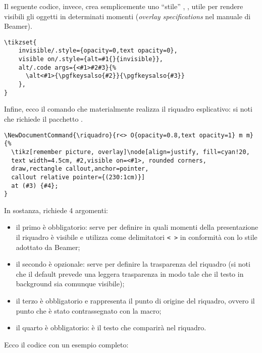 Il seguente codice, invece, crea semplicemente uno ``stile'' \Tikz{}, , utile per rendere visibili gli oggetti in determinati momenti (\emph{overlay specifications} nel manuale di Beamer). 
\begin{lstlisting}[frame=lines]
\tikzset{
    invisible/.style={opacity=0,text opacity=0},
    visible on/.style={alt=#1{}{invisible}},
    alt/.code args={<#1>#2#3}{%
      \alt<#1>{\pgfkeysalso{#2}}{\pgfkeysalso{#3}}
    },
}
\end{lstlisting}
Infine, ecco il comando che materialmente realizza il riquadro esplicativo: si noti che richiede il pacchetto .
\begin{lstlisting}[frame=lines]
\NewDocumentCommand{\riquadro}{r<> O{opacity=0.8,text opacity=1} m m}
{%
  \tikz[remember picture, overlay]\node[align=justify, fill=cyan!20, 
  text width=4.5cm, #2,visible on=<#1>, rounded corners,
  draw,rectangle callout,anchor=pointer,
  callout relative pointer={(230:1cm)}]
  at (#3) {#4};
}
\end{lstlisting}
In sostanza,  richiede 4 argomenti:
\begin{itemize}
\item il primo è obbligatorio: serve per definire in quali momenti della presentazione il riquadro è visibile e utilizza come delimitatori \texttt{< >} in conformità con lo stile adottato da Beamer;
\item il secondo è opzionale: serve per definire la trasparenza del riquadro (si noti che il default prevede una leggera trasparenza in modo tale che il testo in background sia comunque visibile);
\item il terzo è obbligatorio e rappresenta il punto di origine del riquadro, ovvero il punto che è stato contrassegnato con la  macro;
\item il quarto è obbligatorio: è il testo che comparirà nel riquadro.
\end{itemize}
\pagebreak
Ecco il codice con un esempio completo:
